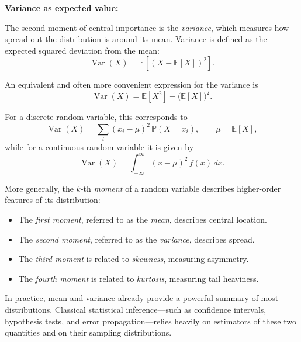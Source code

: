 \textbf{Variance as expected value:}  

\medskip

The second moment of central importance is the \textit{variance}, which measures how spread out the distribution is around its mean. Variance is defined as the expected squared deviation from the mean:
\begin{equation}
    \operatorname{Var}(X)=\mathbb{E}\!\left[(X-\mathbb{E}[X])^2\right].
\end{equation}

\medskip

An equivalent and often more convenient expression for the variance is
\begin{equation}
    \operatorname{Var}(X)=\mathbb{E}[X^2]-\bigl(\mathbb{E}[X]\bigr)^2.
\end{equation}

\medskip

For a discrete random variable, this corresponds to
\begin{equation}
    \operatorname{Var}(X)=\sum_i (x_i-\mu)^2\,\mathbb{P}(X=x_i), \qquad \mu=\mathbb{E}[X],
\end{equation}
while for a continuous random variable it is given by
\begin{equation}
    \operatorname{Var}(X)=\int_{-\infty}^{\infty} (x-\mu)^2\,f(x)\,dx.
\end{equation}

\medskip

More generally, the $k$-th \textit{moment} of a random variable describes higher-order features of its distribution:
\begin{itemize}
    \item The \textit{first moment}, referred to as the \textit{mean}, describes central location.
    \item The \textit{second moment}, referred to as the \textit{variance}, describes spread.
    \item The \textit{third moment} is related to \textit{skewness}, measuring asymmetry.
    \item The \textit{fourth moment} is related to \textit{kurtosis}, measuring tail heaviness.
\end{itemize}

\medskip

In practice, mean and variance already provide a powerful summary of most distributions. Classical statistical inference—such as confidence intervals, hypothesis tests, and error propagation—relies heavily on estimators of these two quantities and on their sampling distributions.

